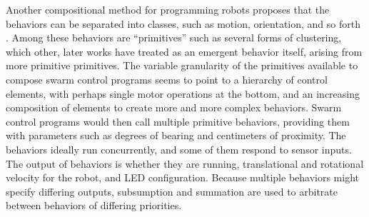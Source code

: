 

Another compositional method for programming robots proposes that the behaviors can be separated into classes, such as motion, orientation, and so forth \citep{mclurkin2004stupid}. 
Among these behaviors are ``primitives'' such as several forms of clustering, which other, later works have treated as an emergent behavior itself, arising from more primitive primitives. 
The variable granularity of the primitives available to compose swarm control programs seems to point to a hierarchy of control elements, with perhaps single motor operations at the bottom, and an increasing composition of elements to create more and more complex behaviors.
Swarm control programs would then call multiple primitive behaviors, providing them with parameters such as degrees of bearing and centimeters of proximity. 
The behaviors ideally run concurrently, and some of them respond to sensor inputs. 
The output of behaviors is whether they are running, translational and rotational velocity for the robot, and LED configuration. 
Because multiple behaviors might specify differing outputs, subsumption and summation are used to arbitrate between behaviors of differing priorities. 

